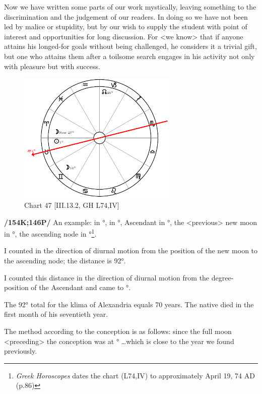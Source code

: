 Now we have written some parts of our work mystically, leaving something to the discrimination and the judgement of our readers. In doing so we have not been led by malice or stupidity, but by our wish to supply the student with point of interest and opportunities for long discussion. For <we know> that if anyone attains his longed-for goals without being challenged, he considers it a trivial gift, but one
who attains them after a toilsome search engages in his activity not only with pleasure but with success.

\enlargethispage{2\baselineskip}

\clearpage
\begin{figure}
\centering
\vspace{-20pt}
\includegraphics[width=0.68\textwidth]{charts/3_13_2}
\caption{Chart 47 [III.13.2, GH L74,IV]}
\label{fig:chart47}
\end{figure}

\noindent \textbf{/154K;146P/} An example: \Sun\xspace in \Taurus\xspace 1°, \Moon\xspace in \Gemini\xspace 16°, Ascendant in \Taurus\xspace 14°, the <previous> new moon in \Aries\xspace 27°, the ascending node in \Capricorn\xspace 25°\footnote{\textit{Greek Horoscopes} dates the chart (L74,IV) to approximately April 19, 74 AD (p.86)}.

I counted in the direction of diurnal motion from the position of the new moon to the ascending node; the distance is 92°. 

I counted this distance in the direction of diurnal motion from the degree-position of the Ascendant and came to \Aquarius\xspace 12°. 

The 92° total for the klima of Alexandria equals 70 years. The native died in the first month of his seventieth year. 

The method according to the conception is as follows: since the full moon <preceding> the conception was at \Capricorn\xspace 21° \ldots which is close to the year we found previously.

